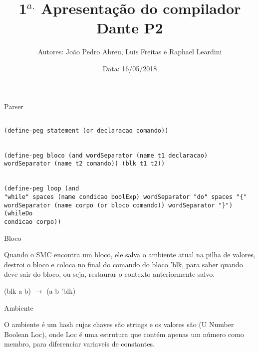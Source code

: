 \documentclass{beamer}
\title[Compiladores 2018.1]{1$^{a.}$ Apresentação do compilador Dante P2}
\author[Abrev.]{Autores: João Pedro Abreu, Luis Freitas e Raphael Leardini}
\institute[UFF]{Universidade Federal Fluminense}
\date{Data: 16/05/2018}
\begin{document}

\begin{frame}[plain]

\titlepage

\end{frame}


\begin{frame}{Parser}
\begin{verbatim}

(define-peg statement (or declaracao comando))


(define-peg bloco (and wordSeparator (name t1 declaracao) wordSeparator (name t2 comando)) (blk t1 t2))


(define-peg loop (and
"while" spaces (name condicao boolExp) wordSeparator "do" spaces "{" wordSeparator (name corpo (or bloco comando)) wordSeparator "}") (whileDo 
condicao corpo))

\end{verbatim}

\end{frame}

\begin{frame}{Bloco}

Quando o SMC encontra um bloco, ele salva o ambiente atual na pilha de valores, destroi o bloco e coloca no final do comando do bloco 'blk, para saber quando deve sair do bloco, ou seja, restaurar o contexto anteriormente salvo.

(blk a b) $\longrightarrow$ (a b 'blk)
\end{frame}


\begin{frame}{Ambiente}

O ambiente é um hash cujas chaves são strings e os valores são (U Number Boolean Loc), onde Loc é uma estrutura
que contém apenas um número como membro, para diferenciar variaveis de constantes.

\end{frame}
\end{document}
